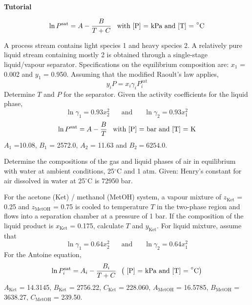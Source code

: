 \begin{MyTutorial}{\begin{center}{\bf Tutorial}\end{center}}
\begin{problem}
       \begin{displaymath}
        \ln P^{\text{sat}} = A - \displaystyle\frac{B}{T + C}\;\;\;\text{with [P] = kPa and [T] = }^{\circ}\text{C}
       \end{displaymath} 
  \end{problem}
%
  \begin{problem}\label{Chapter:VLE:Tutorial:05} %
     A process stream contains light species 1 and heavy species 2. A relatively pure liquid stream containing mostly 2 is obtained through a single-stage liquid/vapour separator. Specifications on the equilibrium composition are: $x_{1}$ = 0.002 and $y_{1}$ = 0.950. Assuming that the modified Raoult's law applies, 
     \begin{displaymath}
       y_{i} P = x_{i}\gamma_{i}P_{i}^{\text{sat}}
     \end{displaymath} 
     Determine $T$ and $P$ for the separator. Given the activity coefficients for the liquid phase,
     \begin{displaymath}
        \ln\gamma_{1} = 0.93x_{2}^{2} \;\;\;\;\;\text{ and }\;\;\;\;\;\ln\gamma_{2}=0.93x_{1}^{2}
     \end{displaymath}
     \begin{displaymath}
        \ln P^{\text{sat}} = A - \displaystyle\frac{B}{T}\;\;\;\text{with [P] = bar and [T] = K}
     \end{displaymath} 
     $A_{1}$ =10.08, $B_{1}$ = 2572.0, $A_{2}$ = 11.63 and $B_{2}=6254.0$.
  \end{problem}
%
  \begin{problem}\label{Chapter:VLE:Tutorial:06} %
     Determine the compositions of the gas and liquid phases of air in equilibrium with water at ambient conditions, 25$^{\circ}$C and 1 atm. Given: Henry's constant for air dissolved in water at 25$^{\circ}$C is 72950 bar. 
  \end{problem}
%
  \begin{problem}\label{Chapter:VLE:Tutorial:07} %
     For the acetone (Ket) / methanol (MetOH) system, a vapour mixture of $z_{\text{Ket}}$ = 0.25 and $z_{\text{MetOH}}$ = 0.75 is cooled to temperature $T$ in the two-phase region and flows into a separation chamber at a pressure of 1 bar. If the composition of the liquid product is $x_{\text{Ket}}$ = 0.175, calculate $T$  and $y_{\text{Ket}}$. For liquid mixture, assume that
     \begin{displaymath}
        \ln\gamma_{1} = 0.64x_{2}^{2} \;\;\;\;\;\text{ and }\;\;\;\;\;\ln\gamma_{2}=0.64x_{1}^{2}
     \end{displaymath}
     For the Antoine equation, 
     \begin{displaymath}
       \ln P_{i}^{\text{sat}} = A_{i} - \displaystyle\frac{B_{i}}{T + C} \;\;\left(\text{ [P] = kPa and [T] = }^{\circ}\text{C}\right)
     \end{displaymath}
     $A_{\text{Ket}}$ = 14.3145, $B_{\text{Ket}}$ = 2756.22, $C_{\text{Ket}}$ = 228.060, $A_{\text{MetOH}}$ = 16.5785, $B_{\text{MetOH}}$ = 3638.27, $C_{\text{MetOH}}$ = 239.50.
  \end{problem}
%
\end{MyTutorial}
